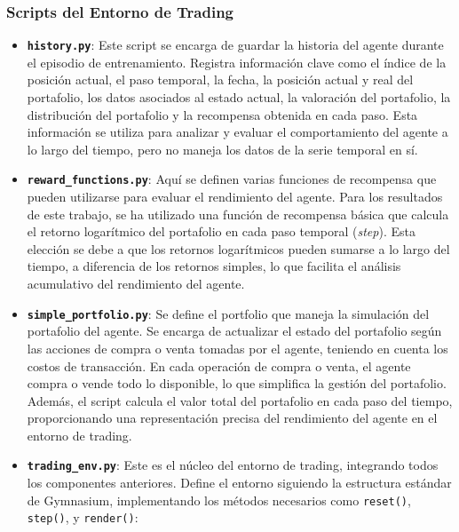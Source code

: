 \documentclass[a4paper,12pt, twoside]{report}
\begin{document}
\subsubsection{Scripts del Entorno de Trading}

\begin{itemize}
    \item \textbf{\texttt{history.py}}: Este script se encarga de guardar la historia del agente durante el episodio de entrenamiento. Registra información clave como el índice de la posición actual, el paso temporal, la fecha, la posición actual y real del portafolio, los datos asociados al estado actual, la valoración del portafolio, la distribución del portafolio y la recompensa obtenida en cada paso. Esta información se utiliza para analizar y evaluar el comportamiento del agente a lo largo del tiempo, pero no maneja los datos de la serie temporal en sí.

    \item \textbf{\texttt{reward\_functions.py}}: Aquí se definen varias funciones de recompensa que pueden utilizarse para evaluar el rendimiento del agente. Para los resultados de este trabajo, se ha utilizado una función de recompensa básica que calcula el retorno logarítmico del portafolio en cada paso temporal (\textit{step}). Esta elección se debe a que los retornos logarítmicos pueden sumarse a lo largo del tiempo, a diferencia de los retornos simples, lo que facilita el análisis acumulativo del rendimiento del agente.

    \item \textbf{\texttt{simple\_portfolio.py}}: Se define el portfolio que maneja la simulación del portafolio del agente. Se encarga de actualizar el estado del portafolio según las acciones de compra o venta tomadas por el agente, teniendo en cuenta los costos de transacción. En cada operación de compra o venta, el agente compra o vende todo lo disponible, lo que simplifica la gestión del portafolio. Además, el script calcula el valor total del portafolio en cada paso del tiempo, proporcionando una representación precisa del rendimiento del agente en el entorno de trading.

    \item \textbf{\texttt{trading\_env.py}}: Este es el núcleo del entorno de trading, integrando todos los componentes anteriores. Define el entorno siguiendo la estructura estándar de Gymnasium, implementando los métodos necesarios como \texttt{reset()}, \texttt{step()}, y \texttt{render()}:


\end{itemize}
\end{document}
